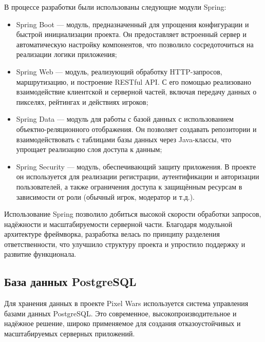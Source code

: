 В процессе разработки были использованы следующие модули Spring:
\begin{itemize}
    \item Spring Boot --- модуль, предназначенный для упрощения конфигурации и быстрой инициализации проекта. Он предоставляет встроенный сервер и автоматическую настройку компонентов, что позволило сосредоточиться на реализации логики приложения;

    \item Spring Web --- модуль, реализующий обработку HTTP-запросов, маршрутизацию, и построение RESTful API. С его помощью реализовано взаимодействие клиентской и серверной частей, включая передачу данных о пикселях, рейтингах и действиях игроков;

    \item Spring Data --- модуль для работы с базой данных с использованием объектно-реляционного отображения. Он позволяет создавать репозитории и взаимодействовать с таблицами базы данных через Java-классы, что упрощает реализацию слоя доступа к данным;

    \item Spring Security --- модуль, обеспечивающий защиту приложения. В проекте он используется для реализации регистрации, аутентификации и авторизации пользователей, а также ограничения доступа к защищённым ресурсам в зависимости от роли (обычный игрок, модератор и т.д.).
\end{itemize}

Использование Spring позволило добиться высокой скорости обработки запросов, надёжности и масштабируемости серверной части. Благодаря модульной архитектуре фреймворка, разработка велась по принципу разделения ответственности, что улучшило структуру проекта и упростило поддержку и развитие функционала. \cite{spring}

\subsection{База данных PostgreSQL}


Для хранения данных в проекте Pixel Wars используется система управления базами данных PostgreSQL. Это современное, высокопроизводительное и надёжное решение, широко применяемое для создания отказоустойчивых и масштабируемых серверных приложений.

